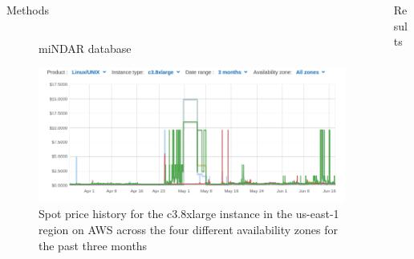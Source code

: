 \documentclass[final,hyperref={pdfpagelabels=false}]{beamer}
\newlength{\columnheight}
\begin{document}
\begin{frame}
\begin{columns}
\begin{column}{.5\textwidth}
{\begin{block}{Methods}
\begin{column}{.47\textwidth}
\begin{figure}
\begin{center}
                    \end{center}
                    \caption{\label{fig:mindar}miNDAR database}
                \end{figure}
              \begin{figure}
                  \includegraphics[width=.99\textwidth]{spot_history.png}
                  \caption{\label{fig:spot_history}Spot price history for the c3.8xlarge instance in the us-east-1 region on AWS across the four different availability zones for the past three months}
              \end{figure}
            \end{column}
        \vfill
        \end{block}
          }
    \end{column}
    \begin{column}{.5\textwidth}
        \parbox[t][\columnheight]{\textwidth}{ %
        \begin{block}{Results}
            \begin{center}
                \begin{table}

\end{table}
\end{center}
\end{block}}
\end{column}
\end{columns}
\end{frame}
\end{document}
